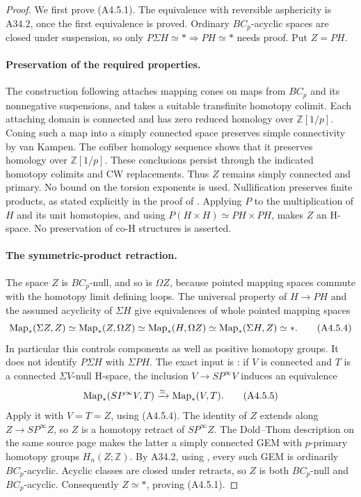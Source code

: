 \begin{proof}
We first prove \textup{(A4.5.1)}.  The equivalence with reversible
asphericity is A34.2, once the first equivalence is proved.  Ordinary
$BC_p$-acyclic spaces are closed under suspension, so only
$P\Sigma H\simeq *\Rightarrow PH\simeq *$ needs proof.
Put $Z=PH$.

\paragraph{Preservation of the required properties.}
The construction following \citet[Theorem~1.1, p.~34]{ABousfield1996}
attaches mapping cones on maps from $BC_p$ and its nonnegative
suspensions, and takes a suitable transfinite homotopy colimit.
Each attaching domain is connected and has zero reduced homology
over $\mathbb Z[1/p]$.  Coning such a map into a simply connected
space preserves simple connectivity by van Kampen.  The cofiber
homology sequence shows that it preserves homology over
$\mathbb Z[1/p]$.  These conclusions persist through the indicated
homotopy colimits and CW replacements.  Thus $Z$ remains simply
connected and primary.  No bound on the torsion exponents is used.
Nullification preserves finite products, as stated explicitly in
the proof of \citet[Theorem~1.7, p.~35]{ABousfield1996}.
Applying $P$ to the multiplication of $H$ and its unit homotopies,
and using $P(H\times H)\simeq PH\times PH$, makes $Z$ an H-space.
No preservation of co-H structures is asserted.

\paragraph{The symmetric-product retraction.}
The space $Z$ is $BC_p$-null, and so is $\Omega Z$, because pointed
mapping spaces commute with the homotopy limit defining loops.
The universal property of $H\to PH$ and the assumed acyclicity
of $\Sigma H$ give equivalences of whole pointed mapping spaces
\[
 \operatorname{Map}_*(\Sigma Z,Z)
 \simeq\operatorname{Map}_*(Z,\Omega Z)
 \simeq\operatorname{Map}_*(H,\Omega Z)
 \simeq\operatorname{Map}_*(\Sigma H,Z)
 \simeq *.
 \tag{A4.5.4}
\]
In particular this controls components as well as positive
homotopy groups.  It does not identify $P\Sigma H$ with $\Sigma PH$.
The exact input is \citet[Key Lemma~1.6, p.~35]{ABousfield1996}:
if $V$ is connected and $T$ is a connected $\Sigma V$-null H-space,
the inclusion $V\to SP^\infty V$ induces an equivalence
\[
 \operatorname{Map}_*(SP^\infty V,T)\xrightarrow{\simeq}\operatorname{Map}_*(V,T).
 \tag{A4.5.5}
\]
Apply it with $V=T=Z$, using \textup{(A4.5.4)}.  The identity of
$Z$ extends along $Z\to SP^\infty Z$, so $Z$ is a homotopy
retract of $SP^\infty Z$.  The Dold--Thom description on the same
source page makes the latter a simply connected GEM with
$p$-primary homotopy groups $H_n(Z;\mathbb Z)$.  By A34.2,
using \citet[Lemma~8.13]{ABousfield1997}, every such GEM is
ordinarily $BC_p$-acyclic.  Acyclic classes are closed under
retracts, so $Z$ is both $BC_p$-null and $BC_p$-acyclic.
Consequently $Z\simeq *$, proving \textup{(A4.5.1)}.


\end{proof}
